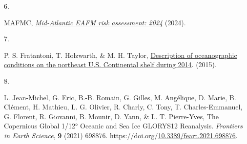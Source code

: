\documentclass[
  10pt,
  letterpaper,
  DIV=11,
  numbers=noendperiod]{scrartcl}
\newlength{\cslhangindent}
\newlength{\csllabelwidth}
\newenvironment{CSLReferences}[2] %
 {\begin{list}{}{%
  \setlength{\itemindent}{0pt}
  \setlength{\leftmargin}{0pt}
  \setlength{\parsep}{0pt}
  \ifodd #1
   \setlength{\leftmargin}{\cslhangindent}
   \setlength{\itemindent}{-1\cslhangindent}
  \fi
  \setlength{\itemsep}{#2\baselineskip}}}
 {\end{list}}
\newcommand{\CSLLeftMargin}[1]{\parbox[t]{\csllabelwidth}{\strut#1\strut}}
\newcommand{\CSLRightInline}[1]{\parbox[t]{\linewidth - \csllabelwidth}{\strut#1\strut}}
\begin{document}
\begin{CSLReferences}{0}{0}
\CSLLeftMargin{6. }%
\CSLRightInline{MAFMC,
\emph{\href{https://static1.squarespace.com/static/511cdc7fe4b00307a2628ac6/t/6747560a3cf66936045e5547/1732728332670/05_EAFM+Risk+Assessment.pdf}{Mid-{Atlantic}
{EAFM} risk assessment: 2024}} (2024).}

\CSLLeftMargin{7. }%
\CSLRightInline{P. S. Fratantoni, T. Holzwarth, \& M. H. Taylor,
\href{https://repository.library.noaa.gov/view/noaa/5047}{Description of
oceanographic conditions on the northeast {U}.{S}. Continental shelf
during 2014}. (2015).}

\CSLLeftMargin{8. }%
\CSLRightInline{L. Jean-Michel, G. Eric, B.-B. Romain, G. Gilles, M.
Angélique, D. Marie, B. Clément, H. Mathieu, L. G. Olivier, R. Charly,
C. Tony, T. Charles-Emmanuel, G. Florent, R. Giovanni, B. Mounir, D.
Yann, \& L. T. Pierre-Yves, The {Copernicus} {Global} 1/12° {Oceanic}
and {Sea} {Ice} {GLORYS12} {Reanalysis}. \emph{Frontiers in Earth
Science}, \textbf{9} (2021) 698876.
https://doi.org/\href{https://doi.org/10.3389/feart.2021.698876}{10.3389/feart.2021.698876}.}

\end{CSLReferences}
\end{document}
